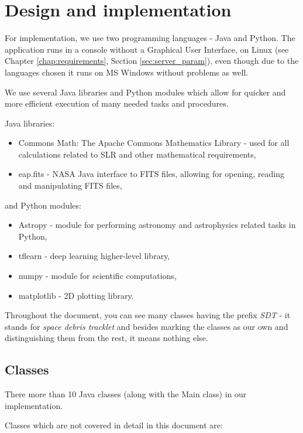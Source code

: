 \chapter{Design and implementation}\label{chap:design}

	For implementation, we use two programming languages - Java and Python. The application runs in a console without a Graphical User Interface, on Linux (see Chapter \ref{chap:requirements}, Section \ref{sec:server_param}), even though due to the languages chosen it runs on MS Windows without problems as well.
	
	We use several Java libraries and Python modules which allow for quicker and more efficient execution of many needed tasks and procedures.
	
	Java libraries:
\begin{itemize}
	\item Commons Math: The Apache Commons Mathematics Library - used for all calculations related to SLR and other mathematical requirements,
	\item eap.fits - NASA Java interface to FITS files, allowing for opening, reading and manipulating FITS files,
\end{itemize}		

and Python modules:
\begin{itemize}
	\item Astropy - module for performing astronomy and astrophysics related tasks in Python,
	\item tflearn - deep learning higher-level library,
	\item numpy - module for scientific computations,
	\item matplotlib - 2D plotting library.
\end{itemize}

	Throughout the document, you can see many classes having the prefix \emph{SDT} - it stands for \emph{space debris tracklet} and besides marking the classes as our own and distinguishing them from the rest, it means nothing else.

\section{Classes}\label{sec:classes}

	There more than 10 Java classes (along with the Main class) in our implementation.
	
	Classes which are not covered in detail in this document are:
	
